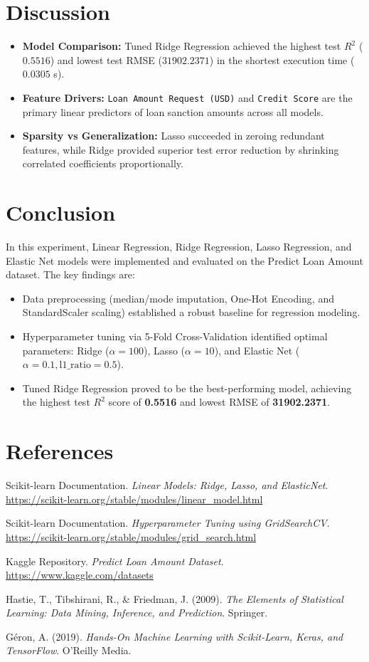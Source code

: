 \documentclass[12pt,a4paper]{article}
\begin{document}
\section{Discussion}
\begin{itemize}
    \item \textbf{Model Comparison:} Tuned Ridge Regression achieved the highest test $R^2$ ($0.5516$) and lowest test RMSE ($31902.2371$) in the shortest execution time ($0.0305$ s).
    \item \textbf{Feature Drivers:} \texttt{Loan Amount Request (USD)} and \texttt{Credit Score} are the primary linear predictors of loan sanction amounts across all models.
    \item \textbf{Sparsity vs Generalization:} Lasso succeeded in zeroing redundant features, while Ridge provided superior test error reduction by shrinking correlated coefficients proportionally.
\end{itemize}

\section{Conclusion}
In this experiment, Linear Regression, Ridge Regression, Lasso Regression, and Elastic Net models were implemented and evaluated on the Predict Loan Amount dataset. The key findings are:
\begin{itemize}
    \item Data preprocessing (median/mode imputation, One-Hot Encoding, and StandardScaler scaling) established a robust baseline for regression modeling.
    \item Hyperparameter tuning via 5-Fold Cross-Validation identified optimal parameters: Ridge ($\alpha=100$), Lasso ($\alpha=10$), and Elastic Net ($\alpha=0.1, \text{l1\_ratio}=0.5$).
    \item Tuned Ridge Regression proved to be the best-performing model, achieving the highest test $R^2$ score of \textbf{0.5516} and lowest RMSE of \textbf{31902.2371}.
\end{itemize}

\section{References}
\begin{enumerate}[label={[\arabic*]}]
    \item Scikit-learn Documentation. \textit{Linear Models: Ridge, Lasso, and ElasticNet}. \url{https://scikit-learn.org/stable/modules/linear_model.html}
    \item Scikit-learn Documentation. \textit{Hyperparameter Tuning using GridSearchCV}. \url{https://scikit-learn.org/stable/modules/grid_search.html}
    \item Kaggle Repository. \textit{Predict Loan Amount Dataset}. \url{https://www.kaggle.com/datasets}
    \item Hastie, T., Tibshirani, R., \& Friedman, J. (2009). \textit{The Elements of Statistical Learning: Data Mining, Inference, and Prediction}. Springer.
    \item Géron, A. (2019). \textit{Hands-On Machine Learning with Scikit-Learn, Keras, and TensorFlow}. O'Reilly Media.
\end{enumerate}
\end{document}
